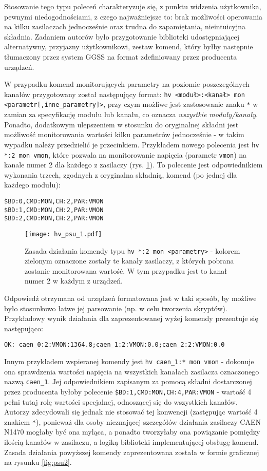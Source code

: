 Stosowanie tego typu poleceń charakteryzuje się, z punktu widzenia użytkownika, pewnymi niedogodnościami, z czego najważniejsze to: brak możliwości operowania na kilku zasilaczach jednocześnie oraz trudna do zapamiętania, nieintuicyjna składnia. Zadaniem autorów było przygotowanie biblioteki udostępniającej alternatywny, przyjazny użytkownikowi, zestaw komend, który byłby następnie tłumaczony przez system GGSS na format zdefiniowany przez producenta urządzeń. 

W przypadku komend monitorujących parametry na poziomie poszczególnych kanałów przygotowany został następujący format: \lstinline{hv <moduł>:<kanał> mon <parametr[,inne_parametry]>}, przy czym możliwe jest zastosowanie znaku \lstinline{*} w zamian za specyfikację modułu lub kanału, co oznacza \emph{wszystkie moduły/kanały}. Ponadto, dodatkowym ulepszeniem w stosunku do oryginalnej składni jest możliwość monitorowania wartości kilku parametrów jednocześnie - w takim wypadku należy przedzielić je przecinkiem. Przykładem nowego polecenia jest \lstinline{hv *:2 mon vmon}, które pozwala na monitorowanie napięcia (parametr \lstinline{vmon}) na kanale numer 2 dla każdego z zasilaczy (rys. \ref{fig:psu1}). To polecenie jest odpowiednikiem wykonania trzech, zgodnych z oryginalna składnią, komend (po jednej dla każdego modułu):
\begin{lstlisting}
$BD:0,CMD:MON,CH:2,PAR:VMON
$BD:1,CMD:MON,CH:2,PAR:VMON
$BD:2,CMD:MON,CH:2,PAR:VMON
\end{lstlisting}

\begin{figure}[H]
\centering
\texttt{[image: hv\_psu\_1.pdf]}
\caption{Zasada działania komendy typu \lstinline{hv *:2 mon <parametry>} - kolorem zielonym oznaczone zostały te kanały zasilaczy, z których pobrana zostanie monitorowana wartość. W tym przypadku jest to kanał numer 2 w każdym z urządzeń.}
\label{fig:psu1}
\end{figure}

Odpowiedź otrzymana od urządzeń formatowana jest w taki sposób, by możliwe było stosunkowo łatwe jej parsowanie (np. w celu tworzenia skryptów). Przykładowy wynik działania dla zaprezentowanej wyżej komendy prezentuje się następująco:
\begin{lstlisting}
OK: caen_0:2:VMON:1364.8;caen_1:2:VMON:0.0;caen_2:2:VMON:0.0
\end{lstlisting}

Innym przykładem wspieranej komendy jest \lstinline{hv caen_1:* mon vmon} - dokonuje ona sprawdzenia wartości napięcia na wszystkich kanałach zasilacza oznaczonego nazwą \lstinline{caen_1}. Jej odpowiednikiem zapisanym za pomocą składni dostarczonej przez producenta byłoby polecenie \lstinline{$BD:1,CMD:MON,CH:4,PAR:VMON} - wartość 4 pełni tutaj rolę wartości specjalnej, odnoszącej się do wszystkich kanałów. Autorzy zdecydowali się jednak nie stosować tej konwencji (zastępując wartość 4 znakiem \lstinline{*}), ponieważ dla osoby nieznającej szczegółów działania zasilaczy CAEN N1470 mogłaby być ona myląca, a ponadto tworzyłaby ona powiązanie pomiędzy ilością kanałów w zasilaczu, a logiką biblioteki implementującej obsługę komend. Zasada działania powyższej komendy zaprezentowana została w formie graficznej na rysunku \ref{fig:psu2}.


